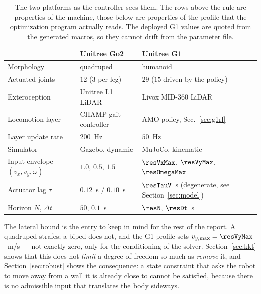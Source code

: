 \documentclass[11pt,a4paper]{article}
\begin{document}
\begin{table}[htbp]
  \centering
  \small
  \caption{The two platforms as the controller sees them. The rows above the rule are properties of the
  machine, those below are properties of the profile that the optimization program actually reads. The
  deployed G1 values are quoted from the generated macros, so they cannot drift from the parameter file.}
  \label{tab:platforms}
  \begin{tabular}{lll}
    \toprule
                                & Unitree Go2                      & Unitree G1 \\
    \midrule
    Morphology                  & quadruped                        & humanoid \\
    Actuated joints             & $12$ ($3$ per leg)               & $29$ ($15$ driven by the policy) \\
    Exteroception               & Unitree L1 LiDAR                 & Livox MID-360 LiDAR \\
    \midrule
    Locomotion layer            & CHAMP gait controller            & AMO policy, Sec.~\ref{sec:g1rl} \\
    Layer update rate           & $200$~Hz                         & $50$~Hz \\
    Simulator                   & Gazebo, dynamic                  & MuJoCo, kinematic \\
    \midrule
    Input envelope $(v_x,v_y,\omega)$
                                & $1.0$, $0.5$, $1.5$              & $\resVxMax$, $\resVyMax$, $\resOmegaMax$ \\
    Actuator lag $\tau$         & $0.12$~s / $0.10$~s              & $\resTauV$~s (degenerate, see
                                                                     Section~\ref{sec:model}) \\
    Horizon $N$, $\Delta t$     & $50$, $0.1$~s                    & $\resN$, $\resDt$~s \\
    \bottomrule
  \end{tabular}
\end{table}

The lateral bound is the entry to keep in mind for the rest of the report. A quadruped strafes; a biped does
not, and the G1 profile sets $v_{y,\max}=\resVyMax$~m/s --- not exactly zero, only for the conditioning of
the solver. Section~\ref{sec:kkt} shows that this does not \emph{limit} a degree of freedom so much as
\emph{remove} it, and Section~\ref{sec:robust} shows the consequence: a state constraint that asks the robot
to move away from a wall it is already close to cannot be satisfied, because there is no admissible input
that translates the body sideways.
\end{document}
